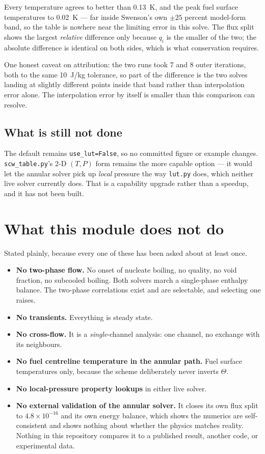 \documentclass[11pt]{article}
\newcommand{\code}[1]{\texttt{#1}}
\begin{document}
Every temperature agrees to better than 0.13~K, and the peak fuel surface temperatures
to 0.02~K --- far inside Swenson's own $\pm 25$ percent model-form band, so the table is
nowhere near the limiting error in this solve. The flux split shows the largest
\emph{relative} difference only because $q_i$ is the smaller of the two; the absolute
difference is identical on both sides, which is what conservation requires.

One honest caveat on attribution: the two runs took 7 and 8 outer iterations, both to
the same 10~J/kg tolerance, so part of the difference is the two solves landing at
slightly different points inside that band rather than interpolation error alone. The
interpolation error by itself is smaller than this comparison can resolve.

\subsection{What is still not done}

The default remains \code{use\_lut=False}, so no committed figure or example changes.
\code{scw\_table.py}'s 2-D $(T,P)$ form remains the more capable option --- it would let
the annular solver pick up \emph{local} pressure the way \code{lut.py} does, which
neither live solver currently does. That is a capability upgrade rather than a speedup,
and it has not been built.

\section{What this module does not do}

Stated plainly, because every one of these has been asked about at least once.

\begin{itemize}
\item \textbf{No two-phase flow.} No onset of nucleate boiling, no quality, no void
      fraction, no subcooled boiling. Both solvers march a single-phase enthalpy balance.
      The two-phase correlations exist and are selectable, and selecting one raises.
\item \textbf{No transients.} Everything is steady state.
\item \textbf{No cross-flow.} It is a \emph{single}-channel analysis: one channel, no
      exchange with its neighbours.
\item \textbf{No fuel centreline temperature in the annular path.} Fuel surface
      temperatures only, because the scheme deliberately never inverts $\Theta$.
\item \textbf{No local-pressure property lookups} in either live solver.
\item \textbf{No external validation of the annular solver.} It closes its own flux split
      to $4.8\times10^{-16}$ and its own energy balance, which shows the numerics are
      self-consistent and shows nothing about whether the physics matches reality. Nothing
      in this repository compares it to a published result, another code, or experimental
      data.
\end{itemize}
\end{document}
